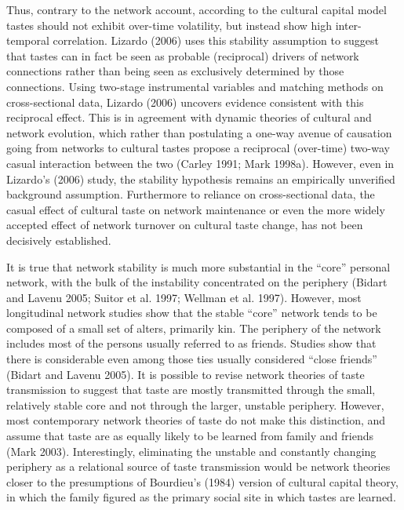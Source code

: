 Thus, contrary to the network account, according to the cultural capital model tastes should not exhibit over-time volatility, but instead show high inter-temporal correlation. Lizardo (2006) uses this stability assumption to suggest that tastes can in fact be seen as probable (reciprocal) drivers of network connections rather than being seen as exclusively determined by those connections. Using two-stage instrumental variables and matching methods on cross-sectional data, Lizardo (2006) uncovers evidence consistent with this reciprocal effect. This is in agreement with dynamic theories of cultural and network evolution, which rather than postulating a one-way avenue of causation going from networks to cultural tastes propose a reciprocal (over-time) two-way casual interaction between the two (Carley 1991; Mark 1998a). However, even in Lizardo’s (2006) study, the stability hypothesis remains an empirically unverified background assumption. Furthermore to reliance on cross-sectional data, the casual effect of cultural taste on network maintenance or even the more widely accepted effect of network turnover on cultural taste change, has not been decisively established.

It is true that network stability is much more substantial in the “core” personal network, with the bulk of the instability concentrated on the periphery (Bidart and Lavenu 2005; Suitor et al. 1997; Wellman et al. 1997). However, most longitudinal network studies show that the stable “core” network tends to be composed of a small set of alters, primarily kin. The periphery of the network includes most of the persons usually referred to as friends. Studies show that there is considerable even among those ties usually considered “close friends” (Bidart and Lavenu 2005). It is possible to revise network theories of taste transmission to suggest that taste are mostly transmitted through the small, relatively stable core and not through the larger, unstable periphery. However, most contemporary network theories of taste do not make this distinction, and assume that taste are as equally likely to be learned from family and friends (Mark 2003). Interestingly, eliminating the unstable and constantly changing periphery as a relational source of taste transmission would be network theories closer to the presumptions of Bourdieu’s (1984) version of cultural capital theory, in which the family figured as the primary social site in which tastes are learned.

